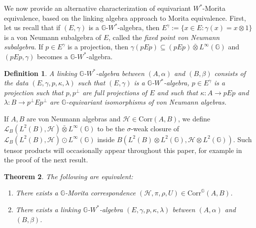 \documentclass[reqno]{amsart}
\numberwithin{equation}{section}
\newtheorem{Theorem}{Theorem}[section]
\newtheorem{Def}[Theorem]{Definition}
\newcommand{\mcH}{\mathcal{H}}
\newcommand{\G}{\mathbb{G}}
\newcommand{\Corr}{\mathrm{Corr}}
\newcommand{\ovot}{\bar{\otimes}}
\begin{document}
We now provide an alternative characterization of equivariant $W^*$-Morita equivalence, based on the linking algebra approach to Morita equivalence. First, let us recall that if $(E, \gamma)$ is a $\G$-$W^*$-algebra, then $E^\gamma:= \{x \in E: \gamma(x)= x \otimes 1\}$ is a von Neumann subalgebra of $E$, called the \emph{fixed point von Neumann subalgebra}. If $p\in E^\gamma$ is a projection, then $\gamma(pEp)\subseteq (pEp)\ovot L^\infty(\G)$ and $(pEp, \gamma)$ becomes a $\G$-$W^*$-algebra.

\begin{Def}
    A linking $\G$-$W^*$-algebra between $(A, \alpha)$ and $(B, \beta)$ consists of the data $(E, \gamma, p, \kappa, \lambda)$ such that $(E, \gamma)$ is a $\G$-$W^*$-algebra, $p\in E^\gamma$ is a projection such that $p,p^\perp$ are full projections of $E$ and such that $\kappa: A \to pEp$ and $\lambda: B\to p^\perp Ep^\perp$ are $\G$-equivariant isomorphisms of von Neumann algebras.
\end{Def}

If $A,B$ are von Neumann algebras and $\mcH \in \Corr(A,B)$, we define $\mathscr{L}_B(L^2(B), \mcH)\ovot L^\infty(\G)$ to be the $\sigma$-weak closure of $\mathscr{L}_B(L^2(B), \mcH)\odot L^\infty(\G)$ inside $B(L^2(B) \otimes L^2(\G), \mcH \otimes L^2(\G))$. Such tensor products will occasionally appear throughout this paper, for example in the proof of the next result.

\begin{Theorem}\label{char1} 
    The following are equivalent:
    \begin{enumerate}\setlength\itemsep{-0.5em}
        \item There exists a $\G$-Morita correspondence $(\mathcal{H}, \pi, \rho, U)\in \Corr^\G(A,B)$.
        \item There exists a linking $\G$-$W^*$-algebra $(E, \gamma,p, \kappa, \lambda)$ between $(A, \alpha)$ and $(B, \beta)$.
    \end{enumerate}
\end{Theorem}
\end{document}
